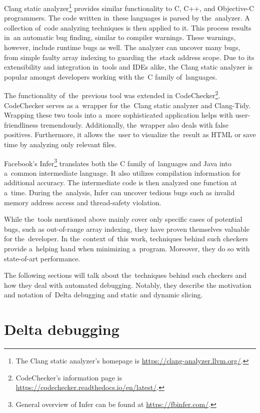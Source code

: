 Clang static analyzer\footnote{The Clang static analyzer's 
homepage is \url{https://clang-analyzer.llvm.org/}.} provides 
similar functionality to C, C++, and 
Ob\-jec\-tive-C programmers.
The code written in~these languages is parsed by the~ana\-ly\-zer.
A collection of~code analyzing techniques is then applied to it.
This process results in~an automatic bug finding, similar to compiler 
warnings.
These war\-nings, however, include runtime bugs as well.
The analyzer can uncover many bugs, from simple faulty array 
indexing to guarding the~stack address scope.
Due to its extensibility and integration in~tools and IDEs alike, 
the Clang static analyzer is popular amongst developers working 
with the~C family of~languages.

The functionality of~the~previous tool was extended 
in CodeChecker\footnote{CodeChecker's information
page is \url{https://codechecker.readthedocs.io/en/latest/}.}.
Code\-Check\-er serves as a~wrapper for the~Clang static analyzer and 
Clang-Tidy.
Wrapping these two tools into a~more sophisticated application helps 
with user-friend\-li\-ness tremendously.
Additionally, the~wrapper also deals with false positives.
Furthermore, it allows the~user to visualize the~result as HTML or 
save time by analyzing only relevant files.

Facebook's Infer\footnote{General overview of Infer can be found at 
\url{https://fbinfer.com/}.} translates both 
the C family of~languages and Java 
into a~common intermediate language.
It also utilizes compilation information for add\-itional accuracy.
The intermediate code is then analyzed one function at a~time.
During the~analysis, Infer can uncover tedious bugs such as invalid 
memory address access and thread-safety violation.

While the~tools mentioned above mainly cover only specific cases 
of potential bugs, such as out-of-range array indexing, they 
have proven themselves valuable for the~developer.
In the~context of~this work, techniques behind such checkers provide 
a~helping hand when minimizing a~program. 
Moreover, they do so with state-of-art performance.

The following sections will talk about the~techniques behind such checkers 
and how they deal with automated debugging. 
Notably, they describe the motivation and notation of~Delta debugging and 
static and dynamic slicing.

\section{Delta debugging}

